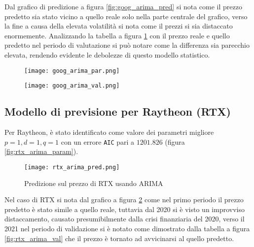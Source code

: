 Dal grafico di predizione a figura \ref{fig:goog_arima_pred} si nota come il prezzo predetto sia stato vicino a quello reale solo nella parte centrale del grafico, verso la fine a causa della elevata volatilità si nota
come il prezzi si sia distaccato enormemente.
Analizzando la tabella a figura \ref{fig:goog_arima_val} con il prezzo reale e quello predetto nel periodo di valutazione si può notare come la differenza sia parecchio elevata, rendendo evidente le debolezze di questo modello statistico.

\begin{figure}[ht]
    \centering
    \begin{minipage}{.5\textwidth}
        \centering
        \vspace{2cm}
        \texttt{[image: goog\_arima\_par.png]}
        \label{fig:goog_arima_param}
    \end{minipage}%
    \begin{minipage}{.5\textwidth}
        \centering
        \texttt{[image: goog\_arima\_val.png]}
        \label{fig:goog_arima_val}
    \end{minipage}
\end{figure}

\pagebreak

\subsection{Modello di previsione per Raytheon (RTX)}

Per Raytheon, è stato identificato come valore dei parametri migliore \(p=1, d=1, q=1\) con un errore \verb|AIC| pari a \(1201.826\) (figura \ref{fig:rtx_arima_param}).

\begin{figure}[ht]
    \centering
    \texttt{[image: rtx\_arima\_pred.png]}
    \caption{Predizione sul prezzo di RTX usando ARIMA}
    \label{fig:rtx_arima_pred}
\end{figure}

Nel caso di RTX si nota dal grafico a figura \ref{fig:rtx_arima_pred} come nel primo periodo il prezzo predetto è stato simile a quello reale, tuttavia dal 2020 si è visto un improvviso distaccamento,
causato presumibilmente dalla crisi finanziaria del 2020, verso il 2021 nel periodo di validazione si è notato come dimostrato dalla tabella a figura \ref{fig:rtx_arima_val} che il prezzo è tornato ad avvicinarsi al quello predetto.


